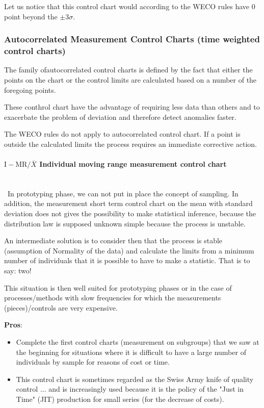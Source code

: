 	Let us notice that this control chart would according to the WECO rules have $0$ point beyond the $\pm 3\sigma$.
	
	\subsubsection{Autocorrelated Measurement Control Charts (time weighted control charts)}
	The family ofautocorrelated control charts is defined by the fact that either the points on the chart or the control limits are calculated based on a number of the foregoing points.

	These conthrol chart have the advantage of requiring less data than others and to exacerbate the problem of deviation and therefore detect anomalies faster.

	The WECO rules do not apply to autocorrelated control chart. If a point is outside the calculated limits the process requires an immediate corrective action.
	
	\paragraph{$\text{I}-\text{MR}/\overline{X}$ Individual moving range measurement control chart}\mbox{}\\\
	In prototyping phase, we can not put in place the concept of sampling. In addition, the measurement short term control chart on the mean with standard deviation  does not gives the possibility to make statistical inference, because the distribution law is supposed unknown simple because the process is unstable.

	An intermediate solution is to consider then that the process is stable (assumption of Normality of the data) and calculate the limits from a minimum number of individuals that it is possible to have to make a statistic. That is to say: two!

	This situation is then well suited for prototyping phases or in the case of processes/methods with slow frequencies for which the measurements (pieces)/controls are very expensive.
	
	\textbf{Pros}:
	\begin{itemize}
		\item Complete the first control charts (measurement on subgroups) that we saw at the beginning for situations where it is difficult to have a large number of individuals by sample for reasons of cost or time.

		\item This control chart is sometimes regarded as the Swiss Army knife of quality control ... and is increasingly used because it is the policy of the "Just in Time" (JIT) production for  small series (for the decrease of costs).
	\end{itemize}

